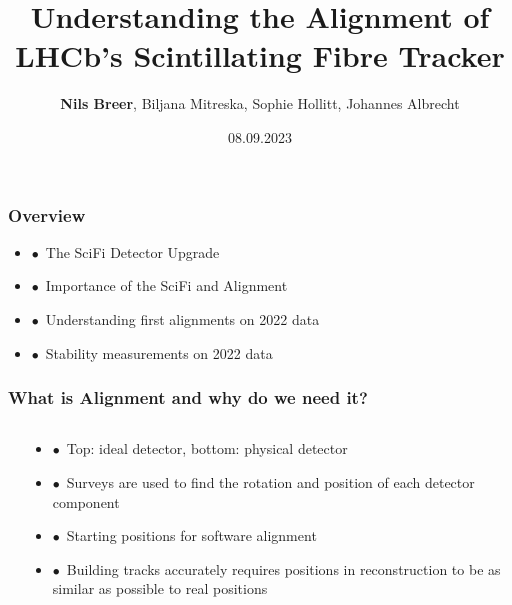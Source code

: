 \documentclass[aspectratio=1610, 12pt, xcolor=dvipsnames]{beamer}
\title{Understanding the Alignment of LHCb's Scintillating Fibre Tracker}
\author[N.Breer]{\textbf{Nils Breer}, Biljana Mitreska, Sophie Hollitt, Johannes Albrecht}
\institute{Maria Laach high energy physics school, Siegen}
\date{08.09.2023}
\begin{document}
\maketitle

\begin{frame}\frametitle{Overview}
  \begin{itemize}
    \item $\bullet$\, The SciFi Detector Upgrade
    \item $\bullet$\, Importance of the SciFi and Alignment
    \item $\bullet$\, Understanding first alignments on 2022 data
    \item $\bullet$\, Stability measurements on 2022 data
  \end{itemize}
\end{frame}

\begin{frame}\frametitle{What is Alignment and why do we need it?}
  \begin{columns}
    \begin{column}[c]{0.48\textwidth}
      
    \end{column}
    \begin{column}[c]{0.48\textwidth}
      \begin{itemize}
        \item $\bullet$\, Top: ideal detector, bottom: physical detector
        \item $\bullet$\, Surveys are used to find the rotation and position of each detector component
        \item $\bullet$\, \to Starting positions for software alignment
        \item $\bullet$\, Building tracks accurately requires positions in reconstruction to be as similar as possible to real positions
      \end{itemize}
    \end{column}
  \end{columns}
\end{frame}
\end{document}
